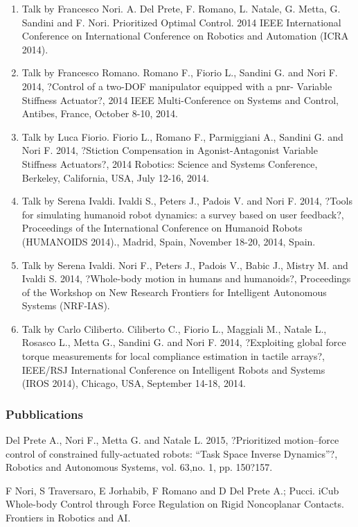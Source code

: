 \begin{enumerate}
\item Talk by Francesco Nori. A. Del Prete, F. Romano, L. Natale, G. Metta, G. Sandini and F. Nori. Prioritized Optimal Control. 2014 IEEE International Conference on International Conference on Robotics and Automation (ICRA 2014). 
\item Talk by Francesco Romano. Romano F., Fiorio L., Sandini G. and Nori F. 2014, ?Control of a two-DOF manipulator equipped with a pnr- Variable Stiffness Actuator?, 2014 IEEE Multi-Conference on Systems and Control, Antibes, France, October 8-10, 2014.
\item Talk by Luca Fiorio. Fiorio L., Romano F., Parmiggiani A., Sandini G. and Nori F. 2014, ?Stiction Compensation in Agonist-Antagonist Variable Stiffness Actuators?, 2014 Robotics: Science and Systems Conference, Berkeley, California, USA, July 12-16, 2014.
\item Talk by Serena Ivaldi. Ivaldi S., Peters J., Padois V. and Nori F. 2014, ?Tools for simulating humanoid robot dynamics: a survey based on user feedback?, Proceedings of the International Conference on Humanoid Robots (HUMANOIDS 2014)., Madrid, Spain, November 18-20, 2014, Spain.
\item Talk by Serena Ivaldi. Nori F., Peters J., Padois V., Babic J., Mistry M. and Ivaldi S. 2014, ?Whole-body motion in humans and humanoids?, Proceedings of the Workshop on New Research Frontiers for Intelligent Autonomous Systems (NRF-IAS).
\item Talk by Carlo Ciliberto. Ciliberto C., Fiorio L., Maggiali M., Natale L., Rosasco L., Metta G., Sandini G. and Nori F. 2014, ?Exploiting global force torque measurements for local compliance estimation in tactile arrays?, IEEE/RSJ International Conference on Intelligent Robots and Systems (IROS 2014), Chicago, USA, September 14-18, 2014.
\end{enumerate}


\subsubsection{Pubblications}

Del Prete A., Nori F., Metta G. and Natale L. 2015, ?Prioritized motion–force control of constrained fully-actuated robots: “Task Space Inverse Dynamics”?, Robotics and Autonomous Systems, vol. 63,no. 1, pp. 150?157.

F Nori, S Traversaro, E Jorhabib, F Romano and D Del Prete A.; Pucci. iCub Whole-body Control through Force Regulation on Rigid Noncoplanar Contacts. Frontiers in Robotics and AI.

